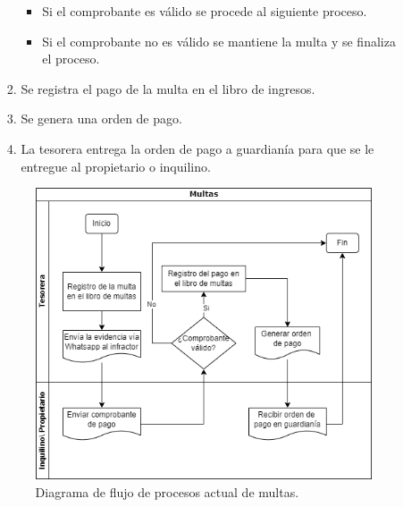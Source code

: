 \begin{itemize}
\begin{enumerate}
\begin{enumerate}
\begin{itemize}
                \item Si el comprobante es válido se procede al siguiente proceso.
                \item Si el comprobante no es válido se mantiene la multa y se finaliza el proceso.
            \end{itemize}
            \item Se registra el pago de la multa en el libro de ingresos.
            \item Se genera una orden de pago.
            \item La tesorera entrega la orden de pago a guardianía para que se le entregue al propietario o inquilino.
        \end{enumerate}
        \begin{figure}[H]
            \centering
            \includegraphics[width=1\textwidth]{resources/images/Diagrama de flujo de proceso multas actual}
            \caption{Diagrama de flujo de procesos actual de multas.}
            \label{fig:flujo-proceso-actual-multas}
        \end{figure}
    \end{enumerate}
\end{itemize}

